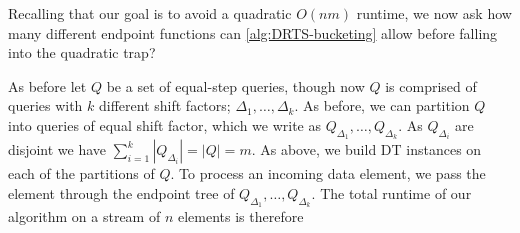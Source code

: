 Recalling that our goal is to avoid a quadratic $O(nm)$ runtime, we now ask how many different endpoint functions can \cref{alg:DRTS-bucketing} allow before falling into the quadratic trap?  

 As before let $Q$ be a set of equal-step queries, though now $Q$ is comprised of queries with $k$ different shift factors; $\Delta_1, \dots, \Delta_k$. As before, we can partition $Q$ into queries of equal shift factor, which we write as $Q_{\Delta_1}, \dots, Q_{\Delta_k}$. As $Q_{\Delta_i}$ are disjoint we have 
$\sum_{i=1}^{k} |Q_{\Delta_i}| = |Q| = m$. As above, we build DT instances on each of the partitions of $Q$. To process an incoming data element, we pass the element through the endpoint tree of $Q_{\Delta_1},\dots, Q_{\Delta_k}$. The total runtime of our algorithm on a stream of $n$ elements is therefore

